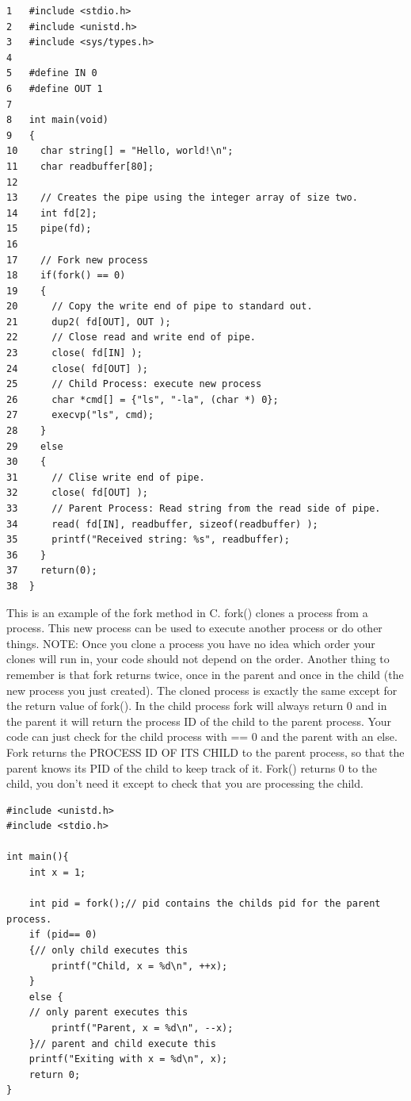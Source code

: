 \newpage

\begin{lstlisting}
1	#include <stdio.h>
2	#include <unistd.h>
3	#include <sys/types.h>
4	
5	#define IN 0
6	#define OUT 1
7	
8	int main(void)
9	{
10	  char string[] = "Hello, world!\n";
11	  char readbuffer[80];
12	
13	  // Creates the pipe using the integer array of size two.
14	  int fd[2];
15	  pipe(fd);
16	
17	  // Fork new process
18	  if(fork() == 0)
19	  {
20	    // Copy the write end of pipe to standard out.
21	    dup2( fd[OUT], OUT );
22	    // Close read and write end of pipe.
23	    close( fd[IN] );
24	    close( fd[OUT] );
25	    // Child Process: execute new process
26	    char *cmd[] = {"ls", "-la", (char *) 0};
27	    execvp("ls", cmd);
28	  }
29	  else
30	  {
31	    // Clise write end of pipe.
32	    close( fd[OUT] );
33	    // Parent Process: Read string from the read side of pipe.
34	    read( fd[IN], readbuffer, sizeof(readbuffer) );
35	    printf("Received string: %s", readbuffer);
36	  }
37	  return(0);
38	}
\end{lstlisting}

 \newpage
{}

This is an example of the fork method in C.  fork() clones a process from a process.  This new process can be used to execute another process or
do other things.  NOTE:  Once you clone a process you have no idea which order your clones will run in, your code should not depend on the order.  Another thing to remember is that fork returns twice, once in the parent and once in the child (the new process you just created).  The cloned process is exactly the same except for the return value of fork().  In the child process fork will always return 0 and in the parent it will return the process ID of the child to the parent process.  Your code can just check for the child process with == 0 and the parent with an else.\\

Fork returns the PROCESS ID OF ITS CHILD to the parent process, so that the parent knows its PID of the child to keep track of it.  Fork() returns 0 to the child, you don't need it except to check that you are processing the child.
\begin{lstlisting}
#include <unistd.h>
#include <stdio.h>

int main(){
	int x = 1;
	
	int pid = fork();// pid contains the childs pid for the parent process.
	if (pid== 0) 
	{// only child executes this
		printf("Child, x = %d\n", ++x);
	} 
	else {
	// only parent executes this
		printf("Parent, x = %d\n", --x);
	}// parent and child execute this
	printf("Exiting with x = %d\n", x);
	return 0;
}
\end{lstlisting}

